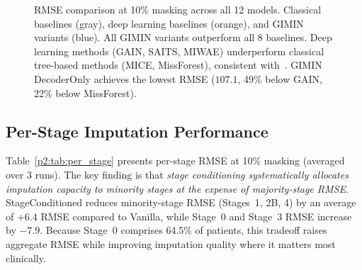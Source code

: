 \begin{figure}[!t]
\centering
{}
\caption{RMSE comparison at 10\% masking across all 12 models. Classical baselines (gray), deep learning baselines (orange), and GIMIN variants (blue). All GIMIN variants outperform all 8 baselines. Deep learning methods (GAIN, SAITS, MIWAE) underperform classical tree-based methods (MICE, MissForest), consistent with~\cite{grinsztajn2022}. GIMIN DecoderOnly achieves the lowest RMSE ($107.1$, 49\% below GAIN, 22\% below MissForest).}
\label{p2:fig:rmse_comparison}
\end{figure}

\subsection{Per-Stage Imputation Performance}
\label{p2:sec:per_stage_analysis}

Table~\ref{p2:tab:per_stage} presents per-stage RMSE at 10\% masking (averaged over 3 runs). The key finding is that \textit{stage conditioning systematically allocates imputation capacity to minority stages at the expense of majority-stage RMSE}. StageConditioned reduces minority-stage RMSE (Stages~1, 2B, 4) by an average of $+6.4$ RMSE compared to Vanilla, while Stage~0 and Stage~3 RMSE increase by $-7.9$. Because Stage~0 comprises 64.5\% of patients, this tradeoff raises aggregate RMSE while improving imputation quality where it matters most clinically.

